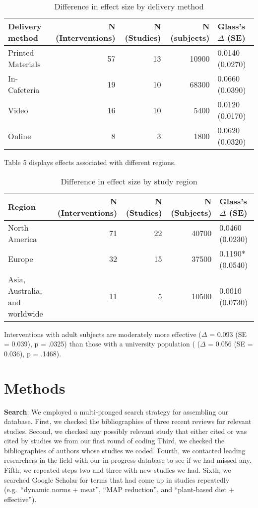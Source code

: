 \documentclass[sn-nature,referee,pdflatex]{sn-jnl}
\begin{document}
\begin{table}[!h]
\centering
\caption{\label{tab:table_four}Difference in effect size by delivery method}
\centering
\begin{tabular}[t]{lrrrl}
\toprule
Delivery method & N (Interventions) & N (Studies) & N (subjects) & Glass's $\Delta$ (SE)\\
\midrule
Printed Materials & 57 & 13 & 10900 & 0.0140 (0.0270)\\
In-Cafeteria & 19 & 10 & 68300 & 0.0660 (0.0390)\\
Video & 16 & 10 & 5400 & 0.0120 (0.0170)\\
Online & 8 & 3 & 1800 & 0.0620 (0.0320)\\
\bottomrule
\end{tabular}
\end{table}

Table 5 displays effects associated with different regions.

\begin{table}[!h]
\centering
\caption{\label{tab:table_five}Difference in effect size by study region}
\centering
\begin{tabular}[t]{lrrrl}
\toprule
Region & N (Interventions) & N (Studies) & N (Subjects) & Glass's $\Delta$ (SE)\\
\midrule
North America & 71 & 22 & 40700 & 0.0460 (0.0230)\\
Europe & 32 & 15 & 37500 & 0.1190* (0.0540)\\
Asia, Australia, and worldwide & 11 & 5 & 10500 & 0.0010 (0.0730)\\
\bottomrule
\end{tabular}
\end{table}

Interventions with adult subjects are moderately more effective
(\(\Delta\) = 0.093 (SE = 0.039), p = .0325) than those with a
university population ( (\(\Delta\) = 0.056 (SE = 0.036), p = .1468).

\section{Methods}\label{sec3}

\textbf{Search}: We employed a multi-pronged search strategy for
assembling our database. First, we checked the bibliographies of three
recent reviews
\citep{mathur2021meta, bianchi2018conscious, bianchi2018restructuring}
for relevant studies. Second, we checked any possibly relevant study
that either cited or was cited by studies we from our first round of
coding Third, we checked the bibliographies of authors whose studies we
coded. Fourth, we contacted leading researchers in the field with our
in-progress database to see if we had missed any. Fifth, we repeated
steps two and three with new studies we had. Sixth, we searched Google
Scholar for terms that had come up in studies repeatedly (e.g.~``dynamic
norms + meat'', ``MAP reduction'', and ``plant-based diet +
effective'').
\end{document}
